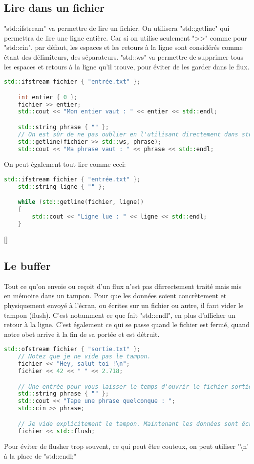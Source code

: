 \documentclass{article}
\begin{document}
\subsection{Lire dans un fichier}
"std::ifstream" va permettre de lire un fichier. On utilisera "std::getline"  qui permettra de lire une ligne entière. Car si on utilise seulement ">>" comme pour "std::cin", par défaut, les espaces et les retours à la ligne sont considérés comme étant des délimiteurs, des séparateurs. "std::ws" va permettre de supprimer tous les espaces et retours à la ligne qu'il trouve, pour éviter de les garder dans le flux.
\begin{lstlisting}[language=C++]
    std::ifstream fichier { "entrée.txt" };

    int entier { 0 };
    fichier >> entier;
    std::cout << "Mon entier vaut : " << entier << std::endl;

    std::string phrase { "" };
    // On est sûr de ne pas oublier en l'utilisant directement dans std::getline.
    std::getline(fichier >> std::ws, phrase);
    std::cout << "Ma phrase vaut : " << phrase << std::endl;
\end{lstlisting}{}

On peut également tout lire comme ceci:

\begin{lstlisting}[language=C++]
    std::ifstream fichier { "entrée.txt" };
    std::string ligne { "" };

    while (std::getline(fichier, ligne))
    {
        std::cout << "Ligne lue : " << ligne << std::endl;
    }
\end{lstlisting}[]

\subsection{Le buffer}
Tout ce qu'on envoie ou reçoit d'un flux n'est pas dfirrectement traité mais mis en mémoire dans un tampon. Pour que les données soient concrètement et physiquement envoyé à l'écran, ou écrites sur un fichier ou autre, il faut vider le tampon (flush). C'est notamment ce que fait "std::endl", en plus d'afficher un retour à la ligne. C'est également ce qui se passe quand le fichier est fermé, quand notre obet arrive à la fin de sa portée et est détruit.

\begin{lstlisting}[language=C++]
    std::ofstream fichier { "sortie.txt" };
    // Notez que je ne vide pas le tampon.
    fichier << "Hey, salut toi !\n";
    fichier << 42 << " " << 2.718;

    // Une entrée pour vous laisser le temps d'ouvrir le fichier sortie.txt.
    std::string phrase { "" };
    std::cout << "Tape une phrase quelconque : ";
    std::cin >> phrase;

    // Je vide explicitement le tampon. Maintenant les données sont écrites.
    fichier << std::flush;
\end{lstlisting}
Pour éviter de flusher trop souvent, ce qui peut être couteux, on peut utiliser '\textbackslash n' à la place de "std::endl;"
\end{document}
